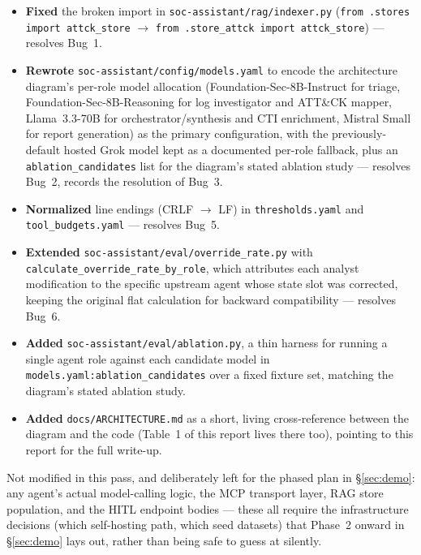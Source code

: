 \documentclass[11pt]{article}
\begin{document}
\begin{itemize}
  \item \textbf{Fixed} the broken import in \texttt{soc-assistant/rag/indexer.py} (\texttt{from .stores import attck\_store} $\rightarrow$ \texttt{from .store\_attck import attck\_store}) --- resolves Bug~1.
  \item \textbf{Rewrote} \texttt{soc-assistant/config/models.yaml} to encode the architecture diagram's per-role model allocation (Foundation-Sec-8B-Instruct for triage, Foundation-Sec-8B-Reasoning for log investigator and ATT\&CK mapper, Llama~3.3-70B for orchestrator/synthesis and CTI enrichment, Mistral Small for report generation) as the primary configuration, with the previously-default hosted Grok model kept as a documented per-role fallback, plus an \texttt{ablation\_candidates} list for the diagram's stated ablation study --- resolves Bug~2, records the resolution of Bug~3.
  \item \textbf{Normalized} line endings (CRLF $\rightarrow$ LF) in \texttt{thresholds.yaml} and \texttt{tool\_budgets.yaml} --- resolves Bug~5.
  \item \textbf{Extended} \texttt{soc-assistant/eval/override\_rate.py} with \texttt{calculate\_override\_rate\_by\_role}, which attributes each analyst modification to the specific upstream agent whose state slot was corrected, keeping the original flat calculation for backward compatibility --- resolves Bug~6.
  \item \textbf{Added} \texttt{soc-assistant/eval/ablation.py}, a thin harness for running a single agent role against each candidate model in \texttt{models.yaml:ablation\_candidates} over a fixed fixture set, matching the diagram's stated ablation study.
  \item \textbf{Added} \texttt{docs/ARCHITECTURE.md} as a short, living cross-reference between the diagram and the code (Table~1 of this report lives there too), pointing to this report for the full write-up.
\end{itemize}

Not modified in this pass, and deliberately left for the phased plan in \S\ref{sec:demo}: any agent's actual model-calling logic, the MCP transport layer, RAG store population, and the HITL endpoint bodies --- these all require the infrastructure decisions (which self-hosting path, which seed datasets) that Phase~2 onward in \S\ref{sec:demo} lays out, rather than being safe to guess at silently.

\end{document}
